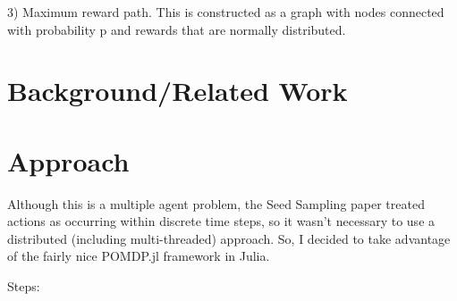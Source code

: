 \documentclass{article}
\begin{document}
3) Maximum reward path. This is constructed as a graph with nodes connected with probability p and rewards that are normally distributed.

\section{Background/Related Work}

\section{Approach}
Although this is a multiple agent problem, the Seed Sampling paper treated actions as occurring within discrete time steps, so it wasn't necessary to use a distributed (including multi-threaded) approach. So, I decided to take advantage of the fairly nice POMDP.jl framework in Julia. 

Steps:
\end{document}
